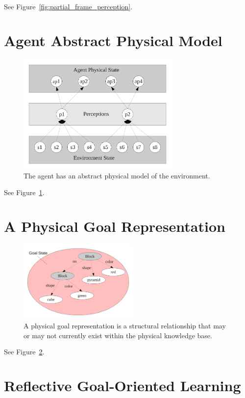 See Figure~\ref{fig:partial_frame_perception}.


\section{Agent Abstract Physical Model}

\begin{figure}[bth]
  \center
  \includegraphics[width=8cm]{gfx/environment_perception_physical}
  \caption[The agent has an abstract physical model of the
    environment.]{The agent has an abstract physical model of the
    environment.}
  \label{fig:environment_perception_physical}
\end{figure}

See Figure~\ref{fig:environment_perception_physical}.


\section{A Physical Goal Representation}

\begin{figure}[bth]
  \center
  \includegraphics[height=4cm]{gfx/goal_state}
  \caption[A physical goal representation]{A physical goal
    representation is a structural relationship that may or may not
    currently exist within the physical knowledge base.}
  \label{fig:goal_state}
\end{figure}

See Figure~\ref{fig:goal_state}.


\section{Reflective Goal-Oriented Learning}


